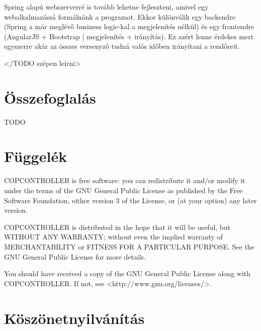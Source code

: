 \documentclass[a4paper,12pt]{report}
\begin{document}
Spring alapú webszerverré is tovább lehetne fejleszteni, amivel egy webalkalmazássá formálnánk a programot. Ekkor különválik egy backendre (Spring a már meglévő business logic-kal a megjelenítés nélkül) és egy frontendre (AngularJS + Bootstrap | megjelenítés + irányítás). Ez azért lenne érdekes mert egyszerre akár az összes versenyző tudná valós időben irányítani a rendőreit. 

</TODO szépen leírni>

\newpage
\chapter{Összefoglalás}
\label{summary}

TODO

\newpage
{}

\begin{singlespace}

\end{singlespace}

\chapter*{Függelék}

\noindent
COPCONTROLLER is free software: you can redistribute it and/or modify
it under the terms of the GNU General Public License as published by
the Free Software Foundation, either version 3 of the License, or
(at your option) any later version.

\noindent
COPCONTROLLER is distributed in the hope that it will be useful,
but WITHOUT ANY WARRANTY; without even the implied warranty of
MERCHANTABILITY or FITNESS FOR A PARTICULAR PURPOSE.  See the
GNU General Public License for more details.

\noindent
You should have received a copy of the GNU General Public License
along with COPCONTROLLER. If not, see <http://www.gnu.org/licenses/>.

\chapter*{Köszönetnyilvánítás}
\end{document}
